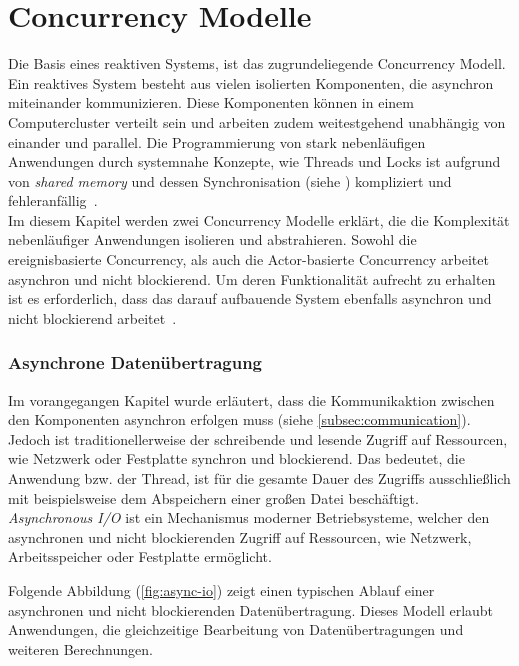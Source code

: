\section{Concurrency Modelle}
Die Basis eines reaktiven Systems, ist das zugrundeliegende Concurrency Modell. Ein reaktives System besteht aus vielen isolierten Komponenten, die asynchron miteinander kommunizieren. Diese Komponenten können in einem Computercluster verteilt sein und arbeiten zudem weitestgehend unabhängig von einander und parallel. Die Programmierung von stark nebenläufigen Anwendungen durch systemnahe Konzepte, wie Threads und Locks ist aufgrund von \textit{shared memory} und dessen Synchronisation (siehe ) kompliziert und fehleranfällig~\cite[S.~72]{erb_concurrent_2012}.\\
Im diesem Kapitel werden zwei Concurrency Modelle erklärt, die die Komplexität nebenläufiger Anwendungen isolieren und abstrahieren. Sowohl die ereignisbasierte Concurrency, als auch die Actor-basierte Concurrency arbeitet asynchron und nicht blockierend. Um deren Funktionalität aufrecht zu erhalten ist es erforderlich, dass das darauf aufbauende System ebenfalls asynchron und nicht blockierend arbeitet~\cite[S.~171]{kuhn_reactive_2015}.

\subsubsection{Asynchrone Datenübertragung}\label{subsec:async-io}
Im vorangegangen Kapitel wurde erläutert, dass die Kommunikaktion zwischen den Komponenten asynchron erfolgen muss (siehe \ref{subsec:communication}). Jedoch ist traditionellerweise der schreibende und lesende Zugriff auf Ressourcen, wie Netzwerk oder Festplatte synchron und blockierend. Das bedeutet, die Anwendung bzw. der Thread, ist für die gesamte Dauer des Zugriffs ausschließlich mit beispielsweise dem Abspeichern einer großen Datei beschäftigt.\\
\textit{Asynchronous I/O} ist ein Mechanismus moderner Betriebsysteme, welcher den asynchronen und nicht blockierenden Zugriff auf Ressourcen, wie Netzwerk, Arbeitsspeicher oder Festplatte ermöglicht.

\pagebreak

Folgende Abbildung (\ref{fig:async-io}) zeigt einen typischen Ablauf einer asynchronen und nicht blockierenden Datenübertragung. Dieses Modell erlaubt Anwendungen, die gleichzeitige Bearbeitung von Datenübertragungen und weiteren Berechnungen. 

